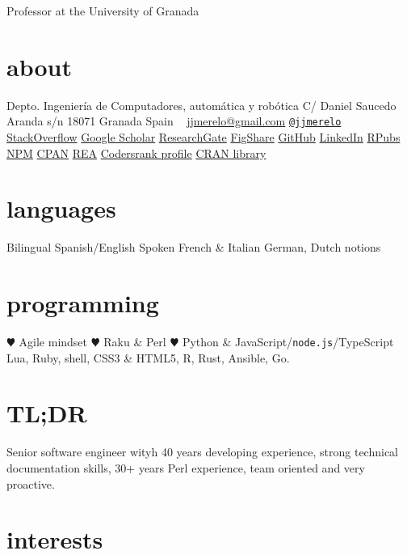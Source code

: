\documentclass[]{friggeri-jj-cv}
\begin{document}
       {Professor at the University of Granada}

\begin{aside}
  \section{about}
    Depto. Ingeniería de Computadores, automática y robótica
    C/ Daniel Saucedo Aranda s/n
    18071 Granada
    Spain
    ~
    \href{mailto:jjmerelo@gmail.com}{jjmerelo@gmail.com}
    \href{http://twitter.com/jjmerelo}{{\tt @jjmerelo}}
    \href{https://stackoverflow.com/users/891440/jjmerelo}{StackOverflow}
    \href{http://scholar.google.com/citations?user=gFxqc64AAAAJ}{Google Scholar}
    \href{https://www.researchgate.net/profile/JJ_Merelo}{ResearchGate}
    \href{https://figshare.com/authors/Juan_J_Merelo/541327}{FigShare}
   \href{https://github.com/JJ}{GitHub}
   \href{http://lnkd.in/dBVqYPa}{LinkedIn}
   \href{http://rpubs.com/jjmerelo/}{RPubs}
   \href{https://www.npmjs.com/~jjmerelo}{NPM}
   \href{http://search.cpan.org/~jmerelo/}{CPAN}
   \href{https://raku.land/zef:jjmerelo}{REA}
   \href{https://profile.codersrank.io/user/jj}{Codersrank profile}
   \href{https://cran.r-project.org/web/packages/dogesr/index.html}{CRAN library}
  \section{languages}
    Bilingual Spanish/English
    Spoken French \& Italian
    German, Dutch notions
  \section{programming}
  {\color{red} \large $\varheartsuit$} Agile mindset
  {\color{red} \large $\varheartsuit$} Raku \& Perl
  {\color{red} $\varheartsuit$} Python \& JavaScript/{\tt node.js}/TypeScript
    Lua, Ruby, shell, CSS3 \& HTML5, R, Rust, Ansible, Go.
  \end{aside}

\section{TL;DR}

Senior software engineer wityh 40 years developing experience, strong
technical documentation skills, 30+ years Perl experience, team oriented and
very proactive.

\section{interests}
\end{document}
